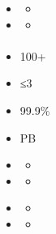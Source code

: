 
\begin{itemize}
\item
  \begin{itemize}
  \tightlist
  \item
  \end{itemize}
\item
  \begin{itemize}
  \tightlist
  \item
  \end{itemize}
\end{itemize}

\hypertarget{section-33}{%
\paragraph{}\label{section-33}}


\begin{itemize}
\tightlist
\item
  100+
\item
  ≤3
\item
  99.9\%
\item
  PB
\end{itemize}


\begin{itemize}
\item
  \begin{itemize}
  \tightlist
  \item
  \end{itemize}
\item
  \begin{itemize}
  \tightlist
  \item
  \end{itemize}
\end{itemize}


\begin{itemize}
\item
  \begin{itemize}
  \tightlist
  \item
  \end{itemize}
\item
  \begin{itemize}
  \tightlist
  \item
  \end{itemize}
\end{itemize}

